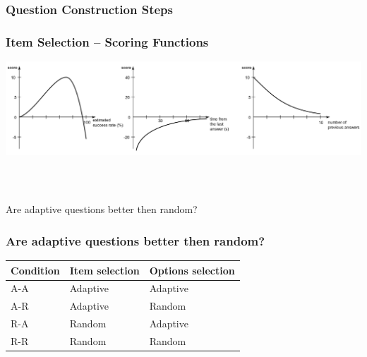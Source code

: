 \documentclass[xcolor=svgnames]{beamer}
\begin{document}
\begin{frame}
	\frametitle{Question Construction Steps}
\end{frame}
\begin{frame}
	\frametitle{Item Selection – Scoring Functions}
   \includegraphics[width=\textwidth]{img/3functions.png}
\end{frame}
\begin{frame}
  \frametitle{~}
\begin{center} 
\huge{Are adaptive questions better then random?}
\end{center}
\end{frame}
\begin{frame}
  \frametitle{Are adaptive questions better then random?}
\begin{center} 
\begin{table}[tbh]
  \centering
  \begin{tabular}{lll}
    \toprule
    Condition & Item selection & Options selection \\
    \midrule
    A-A & Adaptive & Adaptive \\
    A-R & Adaptive & Random \\
    R-A & Random & Adaptive \\
    R-R & Random & Random \\
    \bottomrule
  \end{tabular}
\end{table}
\end{center}
\end{frame}
\end{document}
